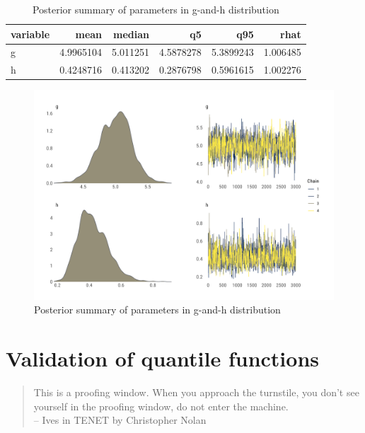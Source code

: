 \documentclass[
  12pt,
]{article}
\begin{document}
\begin{table}[!h]

\caption{\label{tab:gnh-fit-tbl}Posterior summary of parameters in g-and-h distribution}
\centering
\begin{tabular}[t]{lrrrrr}
\toprule
variable & mean & median & q5 & q95 & rhat\\
\midrule
g & 4.9965104 & 5.011251 & 4.5878278 & 5.3899243 & 1.006485\\
h & 0.4248716 & 0.413202 & 0.2876798 & 0.5961615 & 1.002276\\
\bottomrule
\end{tabular}
\end{table}

\begin{figure}

{\centering \includegraphics[width=0.8\linewidth]{ilbm_article_files/figure-latex/gnh-combo-graph-1} 

}

\caption{Posterior summary of parameters in g-and-h distribution}\label{fig:gnh-combo-graph}
\end{figure}

\hypertarget{validation-of-quantile-functions}{%
\section{Validation of quantile functions}\label{validation-of-quantile-functions}}

\begin{quotation}
This is a proofing window. When you approach the turnstile, you don't see yourself in the proofing window, do not enter the machine. \\
-- Ives in TENET by Christopher Nolan
\end{quotation}
\end{document}
